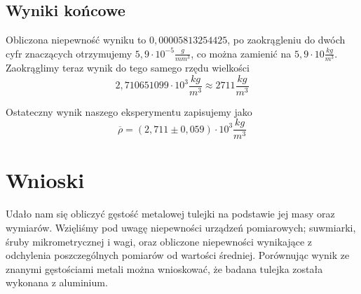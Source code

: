 \documentclass{article}
\begin{document}
\subsection{Wyniki końcowe}
Obliczona niepewność wyniku to $0,00005813254425$, po zaokrągleniu do dwóch cyfr znaczących otrzymujemy $5,9 \cdot 10^{-5} \frac{g}{mm^3}$, co można zamienić na 
$5,9 \cdot 10 \frac{kg}{m^3}$.
Zaokrąglimy teraz wynik do tego samego rzędu wielkości 
$$2,710651099 \cdot 10^3 \frac{kg}{m^3} \approx 2711 \frac{kg}{m^3} $$

Ostateczny wynik naszego eksperymentu zapisujemy jako 
$$ \overline{\rho} = (2,711 \pm 0,059) \cdot 10 ^3 \frac{kg}{m^3} $$
\section{Wnioski}
Udało nam się obliczyć gęstość metalowej tulejki na podstawie jej masy oraz wymiarów. Wzięliśmy pod uwagę niepewności urządzeń pomiarowych; suwmiarki, śruby mikrometrycznej i wagi, oraz obliczone niepewności wynikające z odchylenia poszczególnych pomiarów od wartości średniej. Porównując wynik ze znanymi gęstościami metali można wnioskować, że badana tulejka została wykonana z aluminium.
\end{document}
